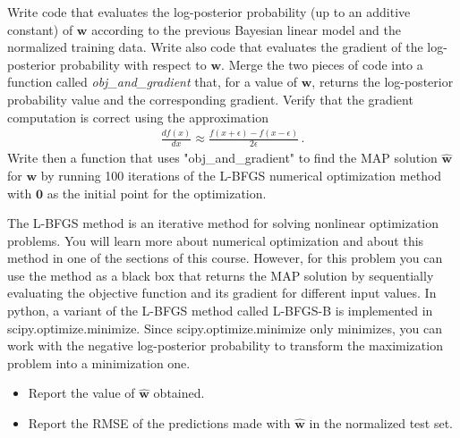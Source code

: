 \documentclass[submit]{harvardml}
\theoremstyle{plain}
\begin{document}
\begin{problem}[14pts]\label{prob:numerical_linear_model}
Write code that evaluates the log-posterior probability (up to an
additive constant) of $\mathbf{w}$ according to the previous Bayesian linear model and the normalized training data.
Write also code that evaluates the gradient of the log-posterior probability with respect to
$\mathbf{w}$. Merge the two pieces of code into a
function called \emph{obj\_and\_gradient} that, for a value of $\mathbf{w}$,
returns the log-posterior probability value and the corresponding gradient.
Verify that the gradient computation is correct using the approximation
\begin{align}
\frac{df(x)}{dx} \approx \frac{f(x + \epsilon) - f(x - \epsilon)}{2\epsilon}\,.
\end{align}
Write then a function that uses "obj\_and\_gradient" to find the MAP solution $\hat{\mathbf{w}}$ for
$\mathbf{w}$ by running 100 iterations of the L-BFGS numerical optimization
method with $\mathbf{0}$ as the initial point for the optimization.

The L-BFGS method is an iterative method for solving nonlinear optimization problems.
You will learn more about numerical optimization and about this method in one of the sections of this course. However,
for this problem you can use the method as a black box that returns the MAP solution
by sequentially evaluating the objective function and its gradient for different input values.
In python, a variant of the L-BFGS method called L-BFGS-B is implemented in scipy.optimize.minimize.
Since scipy.optimize.minimize only minimizes, you can work with the negative
log-posterior probability to transform the maximization problem into a minimization one.

\begin{itemize}
\item Report the value of $\hat{\mathbf{w}}$ obtained.
\item Report the RMSE of the predictions made with $\hat{\mathbf{w}}$ in the normalized test set.
\end{itemize}
\end{problem}
\end{document}

